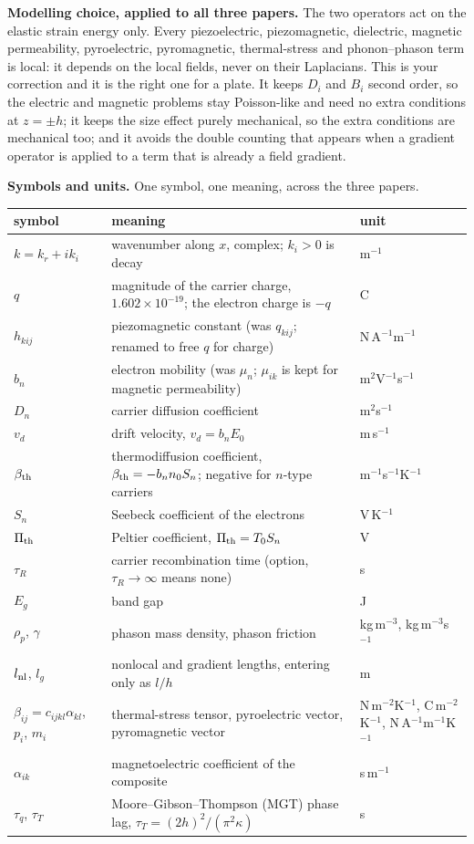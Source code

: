 \documentclass[11pt]{article}
\begin{document}
\medskip
\noindent\textbf{Modelling choice, applied to all three papers.} The two operators act on the elastic
strain energy only. Every piezoelectric, piezomagnetic, dielectric, magnetic permeability, pyroelectric,
pyromagnetic, thermal-stress and phonon--phason term is local: it depends on the local fields, never on
their Laplacians. This is your correction and it is the right one for a plate. It keeps $D_i$ and $B_i$
second order, so the electric and magnetic problems stay Poisson-like and need no extra conditions at
$z=\pm h$; it keeps the size effect purely mechanical, so the extra conditions are mechanical too; and it
avoids the double counting that appears when a gradient operator is applied to a term that is already a
field gradient.

\medskip
\noindent\textbf{Symbols and units.} One symbol, one meaning, across the three papers.
\begin{center}\footnotesize
\begin{tabular}{p{2.3cm}p{6.4cm}p{4.9cm}}
\toprule
symbol & meaning & unit\\
\midrule
$k=k_r+ik_i$ & wavenumber along $x$, complex; $k_i>0$ is decay & m$^{-1}$\\
$q$ & magnitude of the carrier charge, $1.602\times10^{-19}$; the electron charge is $-q$ & C\\
$h_{kij}$ & piezomagnetic constant (was $q_{kij}$; renamed to free $q$ for charge) & N\,A$^{-1}$m$^{-1}$\\
$b_n$ & electron mobility (was $\mu_n$; $\mu_{ik}$ is kept for magnetic permeability) & m$^2$V$^{-1}$s$^{-1}$\\
$D_n$ & carrier diffusion coefficient & m$^2$s$^{-1}$\\
$v_d$ & drift velocity, $v_d=b_nE_0$ & m\,s$^{-1}$\\
$\beta_{\rm th}$ & thermodiffusion coefficient, $\beta_{\rm th}=-b_nn_0S_n$; negative for $n$-type carriers & m$^{-1}$s$^{-1}$K$^{-1}$\\
$S_n$ & Seebeck coefficient of the electrons & V\,K$^{-1}$\\
$\Pi_{\rm th}$ & Peltier coefficient, $\Pi_{\rm th}=T_0S_n$ & V\\
$\tau_R$ & carrier recombination time (option, $\tau_R\to\infty$ means none) & s\\
$E_g$ & band gap & J\\
$\rho_p$, $\gamma$ & phason mass density, phason friction & kg\,m$^{-3}$, kg\,m$^{-3}$s$^{-1}$\\
$l_{\rm nl}$, $l_g$ & nonlocal and gradient lengths, entering only as $l/h$ & m\\
$\beta_{ij}=c_{ijkl}\alpha_{kl}$, $p_i$, $m_i$ & thermal-stress tensor, pyroelectric vector, pyromagnetic vector & N\,m$^{-2}$K$^{-1}$, C\,m$^{-2}$K$^{-1}$, N\,A$^{-1}$m$^{-1}$K$^{-1}$\\
$\alpha_{ik}$ & magnetoelectric coefficient of the composite & s\,m$^{-1}$\\
$\tau_q$, $\tau_T$ & Moore--Gibson--Thompson (MGT) phase lag, $\tau_T=(2h)^2/(\pi^2\kappa)$ & s\\
\bottomrule
\end{tabular}
\end{center}
\end{document}
